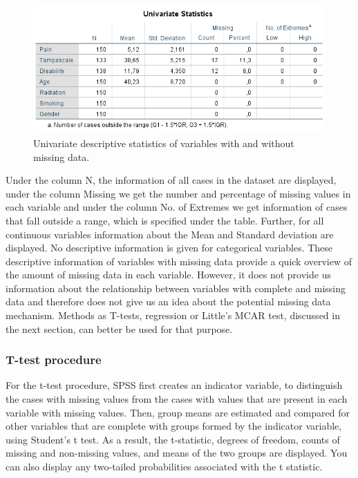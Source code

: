 \documentclass[]{book}
\begin{document}
\begin{figure}

{\centering \includegraphics[width=0.9\linewidth]{images/tab2.4} 

}

\caption{Univariate descriptive statistics of variables with and without missing data.}\label{fig:tab2-4}
\end{figure}

Under the column N, the information of all cases in the dataset are
displayed, under the column Missing we get the number and percentage of
missing values in each variable and under the column No. of Extremes we
get information of cases that fall outside a range, which is specified
under the table. Further, for all continuous variables information about
the Mean and Standard deviation are displayed. No descriptive
information is given for categorical variables. These descriptive
information of variables with missing data provide a quick overview of
the amount of missing data in each variable. However, it does not
provide us information about the relationship between variables with
complete and missing data and therefore does not give us an idea about
the potential missing data mechanism. Methods as T-tests, regression or
Little's MCAR test, discussed in the next section, can better be used
for that purpose.

\subsubsection{T-test procedure}\label{t-test-procedure}

For the t-test procedure, SPSS first creates an indicator variable, to
distinguish the cases with missing values from the cases with values
that are present in each variable with missing values. Then, group means
are estimated and compared for other variables that are complete with
groups formed by the indicator variable, using Student's t test. As a
result, the t-statistic, degrees of freedom, counts of missing and
non-missing values, and means of the two groups are displayed. You can
also display any two-tailed probabilities associated with the t
statistic.
\end{document}

